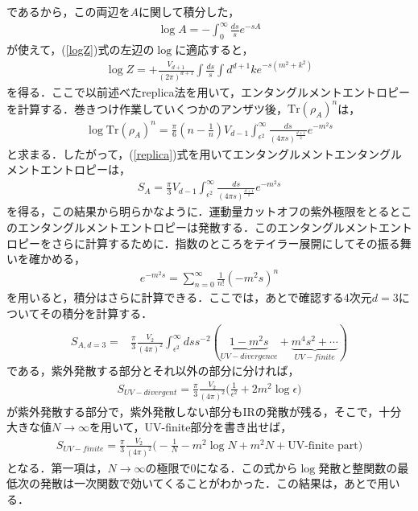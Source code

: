 であるから，この両辺を$A$に関して積分した，
\begin{align}
  \log A=-\int^{\infty}_{0}\frac{ds}{s}e^{-sA}
\end{align}が使えて，(\ref{logZ})式の左辺の$\log$に適応すると，
\begin{align}
  \log Z=+\frac{V_{d+1}}{(2\pi)^{d+1}}\int \frac{ds}{s}\int d^{d+1}k e^{-s(m^2+k^2)}
\end{align}
を得る．ここで以前述べたreplica法を用いて，エンタングルメントエントロピーを計算する．巻きつけ作業していくつかのアンザツ後，$\mathrm{Tr}(\rho_A)^n$は，
\begin{align}
  \log\mathrm{Tr}(\rho_{A})^{n}=\frac{\pi}{6}(n-\frac{1}{n})V_{d-1}\int^{\infty}_{\epsilon^2}\frac{ds}{(4\pi s)^{\frac{d+1}{2}}}e^{-m^2s}
\end{align}
と求まる．したがって，(\ref{replica})式を用いてエンタングルメントエンタングルメントエントロピーは，
\begin{align}
  S_A=\frac{\pi}{3}V_{d-1}\int^{\infty}_{\epsilon^2}\frac{ds}{(4\pi s)^{\frac{d+1}{2}}}e^{-m^2s}
\end{align}
を得る，この結果から明らかなように．運動量カットオフの紫外極限をとるとこのエンタングルメントエントロピーは発散する．このエンタングルメントエントロピーをさらに計算するために．指数のところをテイラー展開にしてその振る舞いを確かめる，
\begin{align}
  e^{-m^2s}=\sum_{n=0}^{\infty}\frac{1}{n!}(-m^2s)^n
\end{align}
を用いると，積分はさらに計算できる．ここでは，あとで確認する4次元$d=3$についてその積分を計算する．
\begin{align}
  S_{A,d=3}=&\frac{\pi}{3}\frac{V_{2}}{(4\pi)^2}\int^{\infty}_{\epsilon^2}ds s^{-2}(\underbrace{1-m^2s}_{UV-divergence}+\underbrace{m^4s^2+\cdots}_{UV-finite})
\end{align}
である，紫外発散する部分とそれ以外の部分に分ければ，
\begin{align}
  S_{UV-divergent}=\frac{\pi}{3}\frac{V_{2}}{(4\pi)^2}\biggl(\frac{1}{\epsilon^2}+2m^2\log\epsilon \biggr)
\end{align}
が紫外発散する部分で，紫外発散しない部分もIRの発散が残る，そこで，十分大きな値$N\to \infty$を用いて，UV-finite部分を書き出せば，
\begin{align}
  S_{UV-finite}=\frac{\pi}{3}\frac{V_{2}}{(4\pi)^2}\biggl(-\frac{1}{N}-m^2\log N+m^2N+\mbox{UV-finite part}\biggr)
\end{align}
となる．第一項は，$N\to\infty$の極限で$0$になる．この式から$\log$発散と整関数の最低次の発散は一次関数で効いてくることがわかった．この結果は，あとで用いる．
